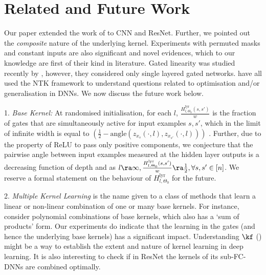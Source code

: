 \section{Related and Future Work}
Our paper extended the work of \cite{ch2020neural} to CNN and ResNet. Further, we pointed out the \emph{composite} nature of the underlying kernel. Experiments with permuted masks and constant inputs are also significant and novel evidences, which to our knowledge are first of their kind in literature.  Gated linearity was studied recently by \cite{sss}, however, they considered only single layered gated networks.\cite{ntk,arora2019exact,cao2019generalization,jacot2019freeze,dudnn} have all used the NTK framework to understand questions related to optimisation and/or generalisation in DNNs. We now discuss the future work below.

1.  \emph{Base Kernel:} %
At randomised initialisation, for each $l$, $\frac{H^{\text{lyr}}_{l,\Theta_0}(s,s')}{w}$ is the fraction of gates that are simultaneously active for input examples $s,s'$, which in the limit of infinite width is equal to $\left(\frac{1}2- \text{angle}(z_{x_s}(\cdot,l), z_{x_{s'}}(\cdot,l))\right)$ \citep{angle}. Further, due to the property of ReLU to pass only positive components, we conjecture that the pairwise angle between input examples measured at the hidden layer outputs is a decreasing function of depth and as $l\ra\infty, \frac{H^{\text{lyr}}_{l,\Theta_0}(s,s')}{w}\ra\frac{1}{2}, \forall s,s'\in[n]$.  We reserve a formal statement on the behaviour of $H^{\text{lyr}}_{l,\Theta_0}$ for the future.

2. \emph{Multiple Kernel Learning} \citep{mkl1,mkl2,mkl3,mkl4} is the name given to a class of methods that learn a linear or non-linear combination of one or many base kernels. For instance, \cite{mkl4} consider polynomial combinations of base kernels, which also has a `sum of products' form.  Our experiments do indicate that the learning in the gates (and hence the underlying base kernels) has a significant impact. Understanding $\kf$ () might be a way to establish the extent and nature of kernel learning in deep learning. It is also interesting to check if in ResNet the kernels of its sub-FC-DNNs are combined optimally. 
